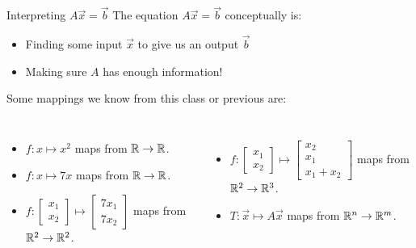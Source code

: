 \documentclass[xcoler=dvipsnames, aspectratio=169]{beamer}
\date{Linear Transformations}
\begin{document}
\begin{frame}{Interpreting $A\vec{x}=\vec{b}$}
    The equation $A\vec{x} = \vec{b}$ conceptually is:
    \pause
    \begin{itemize}
        \item Finding some input $\vec{x}$ to give us an output $\vec{b}$\pause
        \item Making sure $A$ has enough information!\pause
    \end{itemize}
    \begin{example}
        Some mappings we know from this class or previous are:
        \begin{columns}
            \begin{itemize}
                \item $f:x\mapsto x^2$ maps from $\mathbb{R}\rightarrow\mathbb{R}$.\pause
                \item $f:x\mapsto 7x$ maps from $\mathbb{R}\rightarrow\mathbb{R}$.\pause
                \item $f:\begin{bmatrix}x_1\\x_2\end{bmatrix}\mapsto 
                        \begin{bmatrix}7x_1\\7x_2\end{bmatrix}$ maps from $\mathbb{R}^2\rightarrow\mathbb{R}^2$.\pause
            \end{itemize}
            \begin{itemize}
                \item $f:\begin{bmatrix}x_1\\x_2\end{bmatrix}\mapsto 
                        \begin{bmatrix}x_2\\x_1\\x_1+x_2\end{bmatrix}$ maps from
                            $\mathbb{R}^2\rightarrow\mathbb{R}^3$.\pause
                    \item $T:\vec{x}\mapsto A\vec{x}$ maps from $\mathbb{R}^n\rightarrow\mathbb{R}^m$.
            \end{itemize}
        \end{columns}
    \end{example}
\end{frame}
\end{document}
